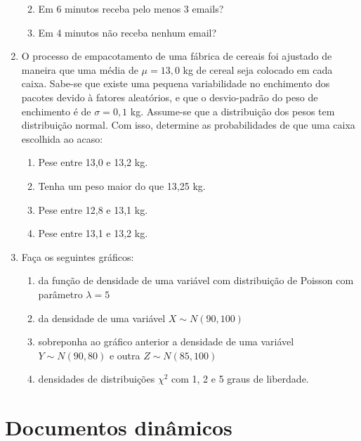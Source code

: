 \documentclass[10pt,a4paper]{book}
\providecommand{\tightlist}{%
  \setlength{\itemsep}{0pt}\setlength{\parskip}{0pt}}
\begin{document}
\begin{enumerate}
  \begin{enumerate}
  \def\labelenumii{\alph{enumii}.}
  \tightlist
  \item
    Em 6 minutos receba pelo menos 3 emails?
  \item
    Em 4 minutos não receba nenhum email?
  \end{enumerate}
\item
  O processo de empacotamento de uma fábrica de cereais foi ajustado de
  maneira que uma média de \(\mu = 13,0\) kg de cereal seja colocado em
  cada caixa. Sabe-se que existe uma pequena variabilidade no enchimento
  dos pacotes devido à fatores aleatórios, e que o desvio-padrão do peso
  de enchimento é de \(\sigma = 0,1\) kg. Assume-se que a distribuição
  dos pesos tem distribuição normal. Com isso, determine as
  probabilidades de que uma caixa escolhida ao acaso:

  \begin{enumerate}
  \def\labelenumii{\alph{enumii}.}
  \tightlist
  \item
    Pese entre 13,0 e 13,2 kg.
  \item
    Tenha um peso maior do que 13,25 kg.
  \item
    Pese entre 12,8 e 13,1 kg.
  \item
    Pese entre 13,1 e 13,2 kg.
  \end{enumerate}
\item
  Faça os seguintes gráficos:

  \begin{enumerate}
  \def\labelenumii{\alph{enumii}.}
  \tightlist
  \item
    da função de densidade de uma variável com distribuição de Poisson
    com parâmetro \(\lambda = 5\)
  \item
    da densidade de uma variável \(X \sim N(90, 100)\)
  \item
    sobreponha ao gráfico anterior a densidade de uma variável
    \(Y \sim N(90, 80)\) e outra \(Z \sim N(85, 100)\)
  \item
    densidades de distribuições \(\chi^2\) com 1, 2 e 5 graus de
    liberdade.
  \end{enumerate}
\end{enumerate}

\appendix


\chapter{Documentos dinâmicos}\label{documentos-dinuxe2micos}
\end{document}
